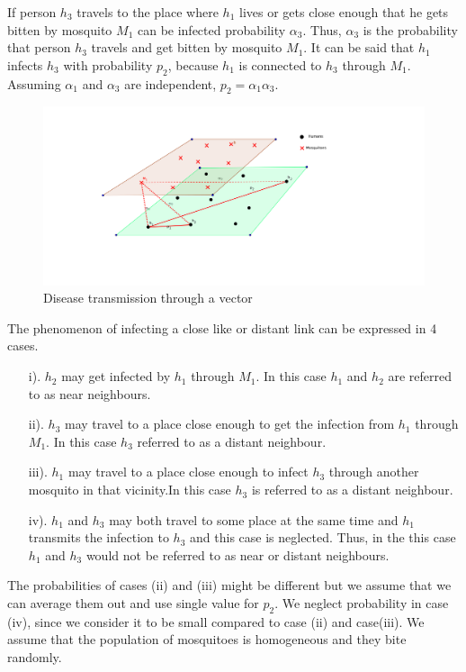  If person $h_3$ travels to the place where $h_1$ lives or gets close enough that he gets bitten by mosquito $M_1$ can be infected probability $\alpha_3$. Thus, $\alpha_3$ is the probability that person $h_3$ travels and get bitten by mosquito $M_1$. It can be said that $h_1$ infects $h_3$ with probability $p_2$, because $h_1$ is connected to $h_3$ through $M_1$. Assuming $\alpha_1$ and $\alpha_3$ are independent, $p_2 = \alpha_1 \alpha_3$.
\begin{figure}[h!]
\centering
\includegraphics[scale=1]{images/human_mosquito.png}
\caption{Disease transmission through a vector} \label{fig5}
\end{figure}
The phenomenon of infecting a close like  or distant link can be expressed in 4 cases.


\begin{itemize}
\item[i).] $h_2$ may get infected by $h_1$ through $M_1$. In this case $h_1$ and $h_2$ are referred to as near neighbours.
\item[ii).] $h_3$ may travel to a place close enough to get the infection from $h_1$ through $M_1$. In this case $h_3$  referred to as a distant neighbour.
\item[iii).] $ h_1$ may travel to a place close enough to infect $h_3$  through another mosquito in that vicinity.In this case $h_3$ is  referred to as a distant neighbour.
\item[iv).] $h_1$  and $h_3$ may both travel to some place at the same time and $h_1$ transmits the infection to $h_3$ and this case is neglected. Thus, in the this case $h_1$ and $h_3$ would not be referred to as near or distant neighbours.
\end{itemize}

The probabilities of cases (ii) and (iii)
might be different but we assume that we can average them out and   use single value for $p_2$. We neglect probability in case (iv), since we consider it to be small compared to case (ii) and case(iii). We assume that the population of mosquitoes is homogeneous and they bite randomly.


